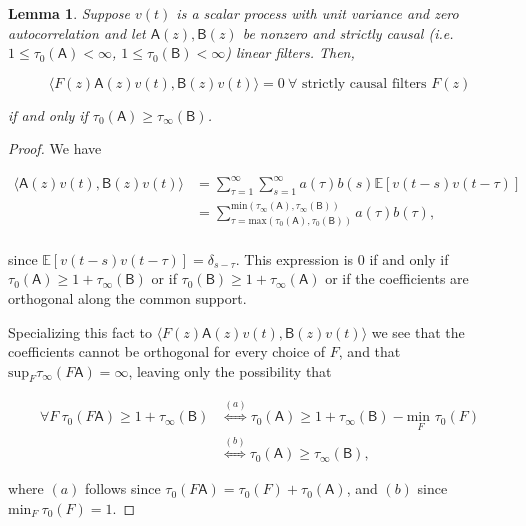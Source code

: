\documentclass{statsoc}
\def\B{\mathsf{B}}  %
\def\A{\mathsf{A}}  %
\newtheorem{lemma}{Lemma}
\def\E{\mathbb{E}}  %
\newcommand{\inner}[2]{\langle #1, #2 \rangle}  %
\begin{document}
\begin{lemma}
  \label{lem:time_lag_cancellation}
  Suppose $v(t)$ is a scalar process with unit variance and zero
  autocorrelation and let $\A(z), \B(z)$ be nonzero and strictly
  causal (i.e. $1 \le \tau_0(\A) < \infty$,
  $1 \le \tau_0(\B) < \infty$) linear filters.  Then,

  \begin{equation}
    \inner{F(z)\A(z)v(t)}{\B(z)v(t)} = 0\ \forall \text{ strictly causal filters } F(z)
  \end{equation}

  if and only if $\tau_0(\A) \ge \tau_\infty(\B)$.
\end{lemma}
\begin{proof}
  We have

  \begin{align}
    \inner{\A(z)v(t)}{\B(z)v(t)} &= \sum_{\tau = 1}^\infty \sum_{s = 1}^\infty a(\tau)b(s)\E[v(t - s)v(t - \tau)]\\
    &= \sum_{\tau = \text{max}(\tau_0(\A), \tau_0(\B))}^{\text{min}(\tau_\infty(\A), \tau_\infty(\B))} a(\tau) b(\tau),\\
  \end{align}

  since $\E[v(t - s)v(t - \tau)] = \delta_{s - \tau}$.  This expression is
  $0$ if and only if $\tau_0(\A) \ge 1 + \tau_\infty(\B)$ or if
  $\tau_0(\B) \ge 1 + \tau_\infty(\A)$ or if the coefficients are orthogonal along
  the common support.

  Specializing this fact to $\inner{F(z)\A(z)v(t)}{\B(z)v(t)}$ we
  see that the coefficients cannot be orthogonal for every choice of
  $F$, and that $\text{sup}_F \tau_\infty(F\A) = \infty$, leaving only
  the possibility that

  \begin{align*}
     \forall F\ \tau_0(F\A) \ge 1 + \tau_\infty(\B) &\overset{(a)}{\iff} \tau_0(\A) \ge 1 + \tau_\infty(\B) - \underset{F}{\text{min }} \tau_0(F)\\
    &\overset{(b)}{\iff} \tau_0(\A) \ge \tau_\infty(\B),
  \end{align*}

  where $(a)$ follows since $\tau_0(F\A) = \tau_0(F) + \tau_0(\A)$,
  and $(b)$ since $\text{min}_F\ \tau_0(F) = 1$.
\end{proof}
\end{document}
